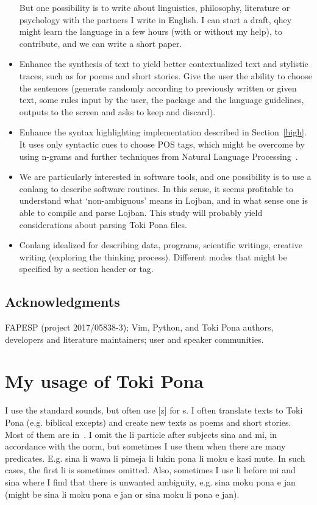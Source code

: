 \documentclass{article}
\begin{document}
\begin{itemize}
    But one possibility is to write about linguistics, philosophy, literature
    or psychology with the partners I write in English.
    I can start a draft,
    qhey might learn the language in a few hours (with or without my help),
    to contribute, and we can write a short paper.
  \item Enhance the synthesis of text to yield better contextualized text
    and stylistic traces, such as for poems and short stories.
    Give the user the ability to choose the sentences (generate randomly according to
    previously written or given text,
    some rules input by the user, the package and the language guidelines,
    outputs to the screen and asks to keep and discard).
  \item Enhance the syntax highlighting implementation described in Section~\ref{high}.
    It uses only syntactic cues to choose POS tags,
    which might be overcome by using n-grams and
    further techniques from Natural Language Processing~\cite{POS}.
  \item We are particularly interested in software tools,
    and one possibility is to use a conlang to describe software
    routines.
    In this sense, it seems profitable
    to understand what `non-ambiguous' means in Lojban,
    and in what sense one is able to compile and parse Lojban.
    This study will probably yield considerations about
    parsing Toki Pona files.
  \item Conlang idealized for describing data, programs,
    scientific writings, creative writing
    (exploring the thinking process).
    Different modes that might be specified by a section header or tag.
\end{itemize}

\subsection*{Acknowledgments}
FAPESP (project 2017/05838-3);
Vim, Python, and Toki Pona authors, developers and literature maintainers;
user and speaker communities. 

\appendix
\section{My usage of Toki Pona}\label{mytoki}

I use the standard sounds, but often use [z] for s.
I often translate texts to Toki Pona (e.g. biblical excepts)
and create new texts as poems and short stories.
Most of them are in~\cite{tokisona}.
I omit the li particle after subjects sina and mi,
in accordance with the norm,
but sometimes I use them when there are many predicates.
E.g. sina li wawa li pimeja li lukin pona li moku e kasi mute.
In such cases, the first li is sometimes omitted.
Also, sometimes I use li before mi and sina where I find
that there is unwanted ambiguity, e.g.
sina moku pona e jan 
(might be sina li moku pona e jan or sina moku li pona e jan).
\end{document}
